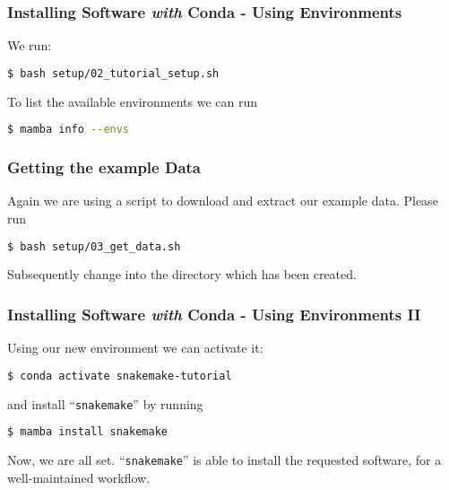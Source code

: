 \begin{frame}[fragile]
  \frametitle{Installing Software \emph{with} Conda - Using Environments}
  We run:
  \begin{lstlisting}[language=Bash, style=Shell]
$ bash setup/02_tutorial_setup.sh
  \end{lstlisting}
  \pause

  To list the available environments we can run
  \begin{lstlisting}[language=Bash, style=Shell]
$ mamba info --envs
  \end{lstlisting}
\end{frame}

\begin{frame}[fragile]
  \frametitle{Getting the example Data}
  Again we are using a script to download and extract our example data. Please run
  \begin{lstlisting}[language=Bash, style=Shell]
$ bash setup/03_get_data.sh
  \end{lstlisting}
  Subsequently change into the directory  which has been created. 
  \pause
\end{frame}


\begin{frame}[fragile]
  \frametitle{Installing Software \emph{with} Conda - Using Environments II}
  Using our new environment we can activate it:
  \begin{lstlisting}[language=Bash, style=Shell]
$ conda activate snakemake-tutorial
  \end{lstlisting}
  and install ``\texttt{snakemake}'' by running
  \begin{lstlisting}[language=Bash, style=Shell]
$ mamba install snakemake
  \end{lstlisting}
  Now, we are all set. ``\texttt{snakemake}'' is able to install the requested software, for a well-maintained workflow.
\end{frame}

